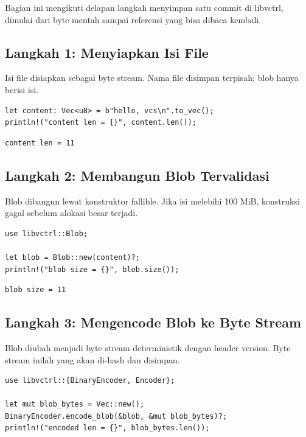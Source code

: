 \documentclass[11pt,a4paper]{article}
\begin{document}
Bagian ini mengikuti delapan langkah menyimpan satu commit di libvctrl, dimulai dari byte mentah sampai referensi yang bisa dibaca kembali.

\subsection{Langkah 1: Menyiapkan Isi File}

Isi file disiapkan sebagai byte stream. Nama file disimpan terpisah; blob hanya berisi isi.

\begin{lstlisting}[style=code]
let content: Vec<u8> = b"hello, vcs\n".to_vec();
println!("content len = {}", content.len());
\end{lstlisting}

\begin{lstlisting}[style=out]
content len = 11
\end{lstlisting}

\subsection{Langkah 2: Membangun Blob Tervalidasi}

Blob dibangun lewat konstruktor fallible. Jika isi melebihi 100 MiB, konstruksi gagal sebelum alokasi besar terjadi.

\begin{lstlisting}[style=code]
use libvctrl::Blob;

let blob = Blob::new(content)?;
println!("blob size = {}", blob.size());
\end{lstlisting}

\begin{lstlisting}[style=out]
blob size = 11
\end{lstlisting}

\subsection{Langkah 3: Mengencode Blob ke Byte Stream}

Blob diubah menjadi byte stream deterministik dengan header version. Byte stream inilah yang akan di-hash dan disimpan.

\begin{lstlisting}[style=code]
use libvctrl::{BinaryEncoder, Encoder};

let mut blob_bytes = Vec::new();
BinaryEncoder.encode_blob(&blob, &mut blob_bytes)?;
println!("encoded len = {}", blob_bytes.len());
\end{lstlisting}
\end{document}
